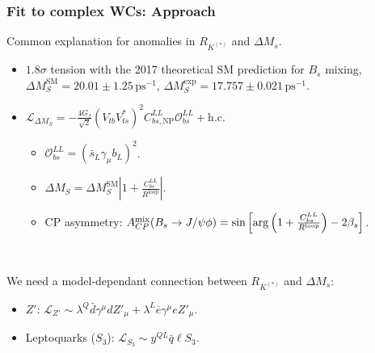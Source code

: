 \documentclass[mathserif, 10pt]{beamer}
\newcommand{\ACPmix}{\ensuremath{A_{CP}^{\rm{mix}}}}
\begin{document}
\begin{frame}\frametitle{Fit to complex WCs: Approach}
    Common explanation for anomalies in $R_{K^{(*)}}$ and $\Delta M_s$.
    \begin{itemize}
        \item $1.8\sigma$ tension with the 2017 theoretical SM prediction for $B_s$ mixing,\\
              $\Delta M_S^\mathrm{SM} = 20.01 \pm 1.25\,\mathrm{ps}^{-1}$, \qquad$\Delta M_S^\mathrm{exp} = 17.757 \pm 0.021 \,\mathrm{ps}^{-1}$. \footnotemark[4]
        \item $\mathcal{L}_{\Delta M_S} = -\frac{4 G_f}{\sqrt{2}} (V_{tb} V_{ts}^*)^2 C_{bs, \mathrm{NP}}^{LL} \mathcal{O}_{bs}^{LL} + \mathrm{h. c.}$
              \begin{itemize}
                  \item $ \mathcal{O}_{bs}^{LL} = (\bar{s}_L \gamma_\mu b_L)^2$.
                  \item $\Delta M_S = \Delta M_S^\mathrm{SM} \left|1 + \frac{C_{bs}^{LL} }{R^\mathrm{loop}} \right|$.
                  \item CP asymmetry\footnotemark[4]: $\ACPmix (B_s\to J/\psi \phi)= \sin \left[\mathrm{arg}\left(   1 + \frac{C_{bs}^{LL} }{R^\mathrm{loop}} \right) - 2 \beta_s \right] $.
              \end{itemize}
    \end{itemize}

    ~

    We need a model-dependant connection between $R_{K^{(*)}}$ and $\Delta M_s$:
    \begin{itemize}
        \item $Z'$: $\mathcal{L}_{Z'} \sim \lambda^Q \bar{d}\gamma^\mu d Z'_\mu + \lambda^L \bar{e}\gamma^\mu e Z'_{\mu}$.
        \item Leptoquarks ($S_3$): $\mathcal{L}_{S_3} \sim y^{QL} \bar{q} \ell S_3$.
    \end{itemize}
\end{frame}
\end{document}
